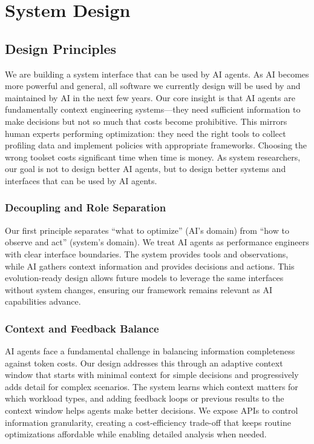 \section{System Design}

\subsection{Design Principles}

We are building a system interface that can be used by AI agents. As AI becomes more powerful and general, all software we currently design will be used by and maintained by AI in the next few years. Our core insight is that AI agents are fundamentally context engineering systems—they need sufficient information to make decisions but not so much that costs become prohibitive. This mirrors human experts performing optimization: they need the right tools to collect profiling data and implement policies with appropriate frameworks. Choosing the wrong toolset costs significant time when time is money. As system researchers, our goal is not to design better AI agents, but to design better systems and interfaces that can be used by AI agents.

\subsubsection{Decoupling and Role Separation}

Our first principle separates ``what to optimize'' (AI's domain) from ``how to observe and act'' (system's domain). We treat AI agents as performance engineers with clear interface boundaries. The system provides tools and observations, while AI gathers context information and provides decisions and actions. This evolution-ready design allows future models to leverage the same interfaces without system changes, ensuring our framework remains relevant as AI capabilities advance.

\subsubsection{Context and Feedback Balance}

AI agents face a fundamental challenge in balancing information completeness against token costs. Our design addresses this through an adaptive context window that starts with minimal context for simple decisions and progressively adds detail for complex scenarios. The system learns which context matters for which workload types, and adding feedback loops or previous results to the context window helps agents make better decisions. We expose APIs to control information granularity, creating a cost-efficiency trade-off that keeps routine optimizations affordable while enabling detailed analysis when needed.

